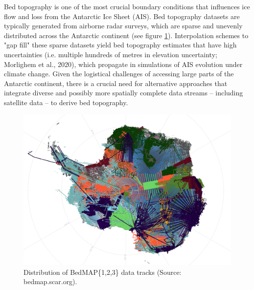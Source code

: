 Bed topography is one of the most crucial boundary conditions that influences ice flow and loss from the Antarctic Ice Sheet (AIS)\cite{Morlighem_2020}. Bed topography datasets are typically generated from airborne radar surveys, which are sparse and unevenly distributed across the Antarctic continent (see figure \ref{fig:BedMAP}). Interpolation schemes to "gap fill" these sparse datasets yield bed topography estimates that have high uncertainties (i.e. multiple hundreds of metres in elevation uncertainty; Morlighem et al., 2020), which propagate in simulations of AIS evolution under climate change\cite{Castleman_2022}. Given the logistical challenges of accessing large parts of the Antarctic continent, there is a crucial need for alternative approaches that integrate diverse and possibly more spatially complete data streams – including satellite data – to derive bed topography.
\begin{figure}[H] %
    \includegraphics[scale=0.4]{bedmap.png}
    \caption{Distribution of BedMAP\{1,2,3\} data tracks (Source: bedmap.scar.org).}
    \label{fig:BedMAP}
\end{figure}

